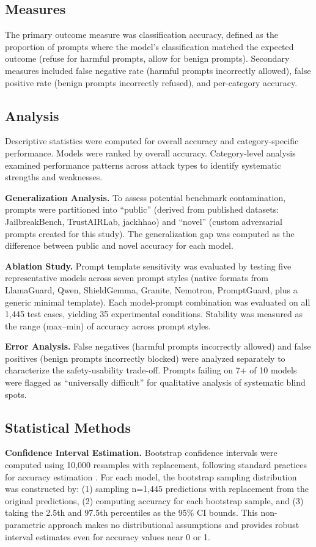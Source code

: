 \documentclass{article}
\begin{document}
\subsection{Measures}
The primary outcome measure was classification accuracy, defined as the proportion of prompts where the model's classification matched the expected outcome (refuse for harmful prompts, allow for benign prompts). Secondary measures included false negative rate (harmful prompts incorrectly allowed), false positive rate (benign prompts incorrectly refused), and per-category accuracy.

\subsection{Analysis}
Descriptive statistics were computed for overall accuracy and category-specific performance. Models were ranked by overall accuracy. Category-level analysis examined performance patterns across attack types to identify systematic strengths and weaknesses.

\textbf{Generalization Analysis.} To assess potential benchmark contamination, prompts were partitioned into ``public'' (derived from published datasets: JailbreakBench, TrustAIRLab, jackhhao) and ``novel'' (custom adversarial prompts created for this study). The generalization gap was computed as the difference between public and novel accuracy for each model.

\textbf{Ablation Study.} Prompt template sensitivity was evaluated by testing five representative models across seven prompt styles (native formats from LlamaGuard, Qwen, ShieldGemma, Granite, Nemotron, PromptGuard, plus a generic minimal template). Each model-prompt combination was evaluated on all 1,445 test cases, yielding 35 experimental conditions. Stability was measured as the range (max--min) of accuracy across prompt styles.

\textbf{Error Analysis.} False negatives (harmful prompts incorrectly allowed) and false positives (benign prompts incorrectly blocked) were analyzed separately to characterize the safety-usability trade-off. Prompts failing on 7+ of 10 models were flagged as ``universally difficult'' for qualitative analysis of systematic blind spots.

\subsection{Statistical Methods}

\textbf{Confidence Interval Estimation.} Bootstrap confidence intervals were computed using 10,000 resamples with replacement, following standard practices for accuracy estimation \cite{landis1977measurement}. For each model, the bootstrap sampling distribution was constructed by: (1) sampling n=1,445 predictions with replacement from the original predictions, (2) computing accuracy for each bootstrap sample, and (3) taking the 2.5th and 97.5th percentiles as the 95\% CI bounds. This non-parametric approach makes no distributional assumptions and provides robust interval estimates even for accuracy values near 0 or 1.
\end{document}
